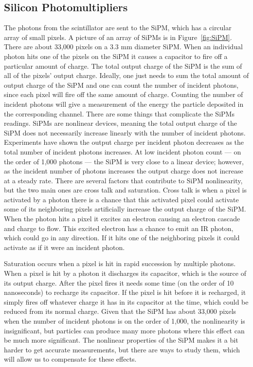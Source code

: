 \subsection{Silicon Photomultipliers}
The photons from the scintillator are sent to the SiPM, which has a circular array of small pixels. A picture of an array of SiPMs is in Figure~\ref{fig:SiPM}. There are about 33,000 pixels on a 3.3 mm diameter SiPM. When an individual photon hits one of the pixels on the SiPM it causes a capacitor to fire off a particular amount of charge. The total output charge of the SiPM is the sum of all of the pixels' output charge. Ideally, one just needs to sum the total amount of output charge of the SiPM and one can count the number of incident photons, since each pixel will fire off the same amount of charge. Counting the number of incident photons will give a measurement of the energy the particle deposited in the corresponding channel. There are some things that complicate the SiPMs readings. SiPMs are nonlinear devices, meaning the total output charge of the SiPM does not necessarily increase linearly with the number of incident photons. Experiments have shown the output charge per incident photon decreases as the total number of incident photons increases. At low incident photon count --- on the order of 1,000 photons --- the SiPM is very close to a linear device; however, as the incident number of photons increases the output charge does not increase at a steady rate. There are several factors that contribute to SiPM nonlinearity, but the two main ones are cross talk and saturation. Cross talk is when a pixel is activated by a photon there is a chance that this activated pixel could activate some of its neighboring pixels artificially increase the output charge of the SiPM. When the photon hits a pixel it excites an electron causing an electron cascade and charge to flow. This excited electron has a chance to emit an IR photon, which could go in any direction. If it hits one of the neighboring pixels it could activate as if it were an incident photon. 

Saturation occurs when a pixel is hit in rapid succession by multiple photons. When a pixel is hit by a photon it discharges its capacitor, which is the source of its output charge. After the pixel fires it needs some time (on the order of 10 nanoseconds) to recharge its capacitor. If the pixel is hit before it is recharged, it simply fires off whatever charge it has in its capacitor at the time, which could be reduced from its normal charge. Given that the SiPM has about 33,000 pixels when the number of incident photons is on the order of 1,000, the nonlinearity is insignificant, but particles can produce many more photons where this effect can be much more significant. The nonlinear properties of the SiPM makes it a bit harder to get accurate measurements, but there are ways to study them, which will allow us to compensate for these effects.

